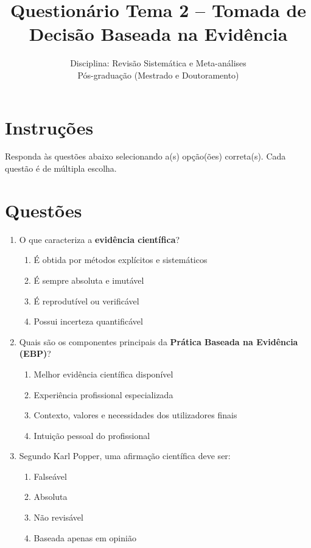 \documentclass[12pt,a4paper]{article}
\title{Questionário Tema 2 – Tomada de Decisão Baseada na Evidência}
\author{Disciplina: Revisão Sistemática e Meta-análises\\Pós-graduação (Mestrado e Doutoramento)}
\date{}
\begin{document}
\maketitle

\section*{Instruções}
Responda às questões abaixo selecionando a(s) opção(ões) correta(s). Cada questão é de múltipla escolha.  

\section*{Questões}

\begin{enumerate}[label=\textbf{Q\arabic*:}]
    
\item O que caracteriza a \textbf{evidência científica}? 
\begin{enumerate}[label=\alph*)]
    \item É obtida por métodos explícitos e sistemáticos
    \item É sempre absoluta e imutável
    \item É reprodutível ou verificável
    \item Possui incerteza quantificável
\end{enumerate}

\item Quais são os componentes principais da \textbf{Prática Baseada na Evidência (EBP)}?
\begin{enumerate}[label=\alph*)]
    \item Melhor evidência científica disponível
    \item Experiência profissional especializada
    \item Contexto, valores e necessidades dos utilizadores finais
    \item Intuição pessoal do profissional
\end{enumerate}

\item Segundo Karl Popper, uma afirmação científica deve ser:
\begin{enumerate}[label=\alph*)]
    \item Falseável
    \item Absoluta
    \item Não revisável
    \item Baseada apenas em opinião
\end{enumerate}


\end{enumerate}
\end{document}
